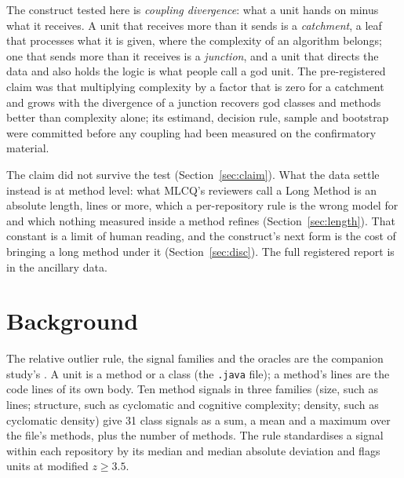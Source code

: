 \documentclass[11pt,a4paper]{article}
\newcommand{\madz}{modified $z \geq 3.5$}
\begin{document}
The construct tested here is \emph{coupling divergence}: what a unit hands
on minus what it receives. A unit that receives more than it sends is a
\emph{catchment}, a leaf that processes what it is given, where the
complexity of an algorithm belongs; one that sends more than it receives
is a \emph{junction}, and a unit that directs the data and also holds the
logic is what people call a god unit. The pre-registered claim was that
multiplying complexity by a factor that is zero for a catchment and grows
with the divergence of a junction recovers god classes and methods better
than complexity alone; its estimand, decision rule, sample and bootstrap
were committed before any coupling had been measured on the confirmatory
material.

The claim did not survive the test (Section~\ref{sec:claim}). What the
data settle instead is at method level: what MLCQ's reviewers call a Long
Method is an absolute length, \lwLengthCutoff{} lines or more, which a
per-repository rule is the wrong model for and which nothing measured
inside a method refines (Section~\ref{sec:length}). That constant is a
limit of human reading, and the construct's next form is the cost of
bringing a long method under it (Section~\ref{sec:disc}). The full
registered report is in the ancillary data.

\section{Background}

The relative outlier rule, the signal families and the oracles are the
companion study's \cite{paperone}. A unit is a method or a class (the
\texttt{.java} file); a method's lines are the code lines of its own body. Ten method signals in three
families (size, such as lines; structure, such as cyclomatic
\cite{mcCabe1976} and cognitive \cite{campbell2018} complexity; density,
such as cyclomatic density) give 31 class signals as a sum, a mean and a
maximum over the file's methods, plus the number of methods. The rule
standardises a signal within each repository by its median and median
absolute deviation and flags units at \madz{}.
\end{document}
